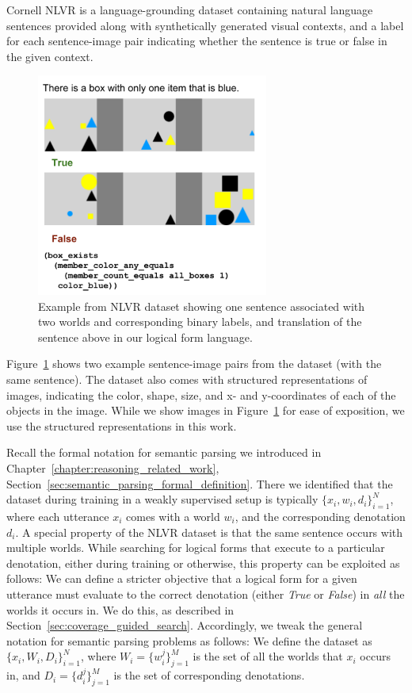 Cornell NLVR is a language-grounding dataset containing natural language
sentences provided along with synthetically generated visual contexts, and a
label for each sentence-image pair indicating whether the sentence is true or
false in the given context.
\begin{figure} \centering
	\includegraphics[width=3in]{figures/nlvr_example_with_worlds_and_lf.png}
	\caption{Example
	from NLVR dataset showing one sentence associated with two worlds and
	corresponding binary labels, and translation of the sentence above in
	our logical form language.} \label{fig:nlvr_example_with_two_worlds} 
\end{figure}
Figure~\ref{fig:nlvr_example_with_two_worlds} shows two example sentence-image pairs
from the dataset (with the same sentence). The dataset also comes with
structured representations of images, indicating the color, shape, size,
and x- and y-coordinates of each of the objects in the image. While we
show images in Figure~\ref{fig:nlvr_example_with_two_worlds} for ease of exposition, we
use the structured representations in this work.

Recall the formal notation for semantic parsing we introduced in
Chapter~\ref{chapter:reasoning_related_work},
Section~\ref{sec:semantic_parsing_formal_definition}. There we identified that
the dataset during training in a weakly supervised setup is typically $\{x_i,
w_i, d_i\}_{i=1}^N$, where
each utterance $x_i$ comes with a world $w_i$, and the corresponding denotation
$d_i$. 
A special property of the NLVR dataset is that the same sentence occurs with
multiple worlds. While searching for logical forms that execute to a particular
denotation, either during training or otherwise, this property can be exploited
as follows: We can define a stricter objective that a logical form for a given
utterance must evaluate to the correct denotation (either \textit{True} or
\textit{False}) in \emph{all} the worlds it occurs in. We do this, as described
in Section~\ref{sec:coverage_guided_search}. Accordingly, we tweak the general
notation for semantic parsing problems as follows: We define the dataset as
$\{x_i, W_i, D_i\}_{i=1}^N$, where $W_i = \{w_i^j\}_{j=1}^M$ is the set of all
the worlds that $x_i$ occurs in, and $D_i = \{d_i^j\}_{j=1}^M$ is the set of
corresponding denotations.

